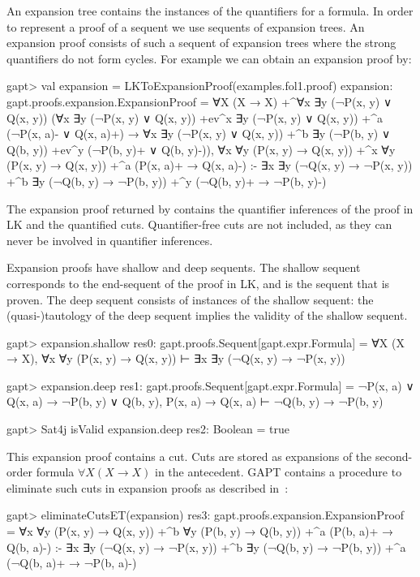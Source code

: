 \documentclass[a4paper,11pt]{book}
\newcommand{\impl}{\to} %
\newcommand{\cli}[1]{{\ttfamily {#1}}}
\begin{document}
An expansion tree contains the instances of the quantifiers for a formula.  In order
to represent a proof of a sequent we use sequents of expansion trees.  An
expansion proof consists of such a sequent of expansion trees where the
strong quantifiers do not form cycles.
For example we can obtain an expansion proof by:
\begin{clilisting}
gapt> val expansion = LKToExpansionProof(examples.fol1.proof)
expansion: gapt.proofs.expansion.ExpansionProof =
∀X (X → X)
  +^{∀x ∃y (¬P(x, y) ∨ Q(x, y))}
    (∀x ∃y (¬P(x, y) ∨ Q(x, y)) +ev^{x}
        ∃y (¬P(x, y) ∨ Q(x, y))
        +^{a} (¬P(x, a)- ∨ Q(x, a)+) →
      ∀x ∃y (¬P(x, y) ∨ Q(x, y))
        +^{b} ∃y (¬P(b, y) ∨ Q(b, y)) +ev^{y} (¬P(b, y)+ ∨ Q(b, y)-)),
∀x ∀y (P(x, y) → Q(x, y))
  +^{x} ∀y (P(x, y) → Q(x, y)) +^{a} (P(x, a)+ → Q(x, a)-)
:-
∃x ∃y (¬Q(x, y) → ¬P(x, y))
  +^{b} ∃y (¬Q(b, y) → ¬P(b, y)) +^{y} (¬Q(b, y)+ → ¬P(b, y)-)

\end{clilisting}

The expansion proof returned by \cli{LKToExpansionProof} contains the
quantifier inferences of the proof in LK and the quantified cuts.
Quantifier-free cuts are not included, as they can never be involved in
quantifier inferences.

Expansion proofs have shallow and deep sequents.  The shallow sequent
corresponds to the end-sequent of the proof in LK, and is the sequent that is
proven.  The deep sequent consists of instances of the shallow sequent: the
(quasi-)tautology of the deep sequent implies the validity of the shallow
sequent.
\begin{clilisting}
gapt> expansion.shallow
res0: gapt.proofs.Sequent[gapt.expr.Formula] = ∀X (X → X), ∀x ∀y (P(x, y) → Q(x, y)) ⊢ ∃x ∃y (¬Q(x, y) → ¬P(x, y))

gapt> expansion.deep
res1: gapt.proofs.Sequent[gapt.expr.Formula] = ¬P(x, a) ∨ Q(x, a) → ¬P(b, y) ∨ Q(b, y), P(x, a) → Q(x, a) ⊢ ¬Q(b, y) → ¬P(b, y)

gapt> Sat4j isValid expansion.deep
res2: Boolean = true

\end{clilisting}

This expansion proof contains a cut.  Cuts are stored as expansions of the
second-order formula $\forall X (X \impl X)$ in the antecedent.  GAPT contains
a procedure to eliminate such cuts in expansion proofs as described
in~\cite{Hetzl2013Expansion}:
\begin{clilisting}
gapt> eliminateCutsET(expansion)
res3: gapt.proofs.expansion.ExpansionProof =
∀x ∀y (P(x, y) → Q(x, y))
  +^{b} ∀y (P(b, y) → Q(b, y)) +^{a} (P(b, a)+ → Q(b, a)-)
:-
∃x ∃y (¬Q(x, y) → ¬P(x, y))
  +^{b} ∃y (¬Q(b, y) → ¬P(b, y)) +^{a} (¬Q(b, a)+ → ¬P(b, a)-)

\end{clilisting}
\end{document}

